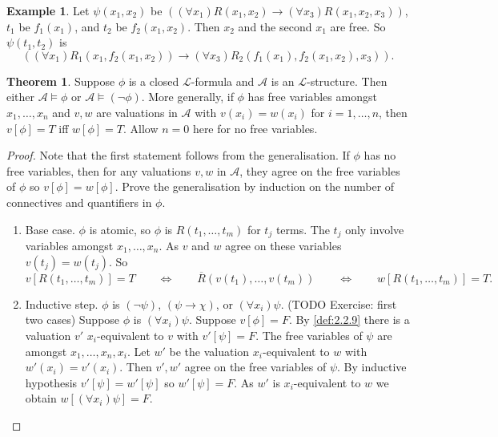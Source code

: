 \documentclass{article}
\newcommand{\rb}[1]{\left( #1 \right)}
\renewcommand{\sb}[1]{\left[ #1 \right]}
\newcommand{\notb}[1]{\rb{\neg #1}}
\newcommand{\impb}[2]{\rb{#1 \rightarrow #2}}
\newcommand{\fab}[1]{\rb{\forall #1}}
\theoremstyle{definition}\newtheorem{definition}{Definition}[subsection]
\theoremstyle{definition}\newtheorem{remark}[definition]{Remark}
\theoremstyle{definition}\newtheorem*{example}{Example}
\theoremstyle{definition}\newtheorem*{note}{Note}
\newtheorem{theorem}[definition]{Theorem}
\begin{document}
\begin{example}
Let $ \psi\rb{x_1, x_2} $ be $ \impb{\fab{x_1}R\rb{x_1, x_2}}{\fab{x_3}R\rb{x_1, x_2, x_3}} $, $ t_1 $ be $ f_1\rb{x_1} $, and $ t_2 $ be $ f_2\rb{x_1, x_2} $. Then $ x_2 $ and the second $ x_1 $ are free. So $ \psi\rb{t_1, t_2} $ is
$$ \impb{\fab{x_1}R_1\rb{x_1, f_2\rb{x_1, x_2}}}{\fab{x_3}R_2\rb{f_1\rb{x_1}, f_2\rb{x_1, x_2}, x_3}}. $$
\end{example}

\begin{theorem}
Suppose $ \phi $ is a closed $ \mathcal{L} $-formula and $ \mathcal{A} $ is an $ \mathcal{L} $-structure. Then either $ \mathcal{A} \vDash \phi $ or $ \mathcal{A} \vDash \notb{\phi} $. More generally, if $ \phi $ has free variables amongst $ x_1, \dots, x_n $ and $ v, w $ are valuations in $ \mathcal{A} $ with $ v\rb{x_i} = w\rb{x_i} $ for $ i = 1, \dots, n $, then $ v\sb{\phi} = T $ iff $ w\sb{\phi} = T $. Allow $ n = 0 $ here for no free variables.
\end{theorem}

\begin{proof}
Note that the first statement follows from the generalisation. If $ \phi $ has no free variables, then for any valuations $ v, w $ in $ \mathcal{A} $, they agree on the free variables of $ \phi $ so $ v\sb{\phi} = w\sb{\phi} $. Prove the generalisation by induction on the number of connectives and quantifiers in $ \phi $.
\begin{enumerate}
\item Base case. $ \phi $ is atomic, so $ \phi $ is $ R\rb{t_1, \dots, t_m} $ for $ t_j $ terms. The $ t_j $ only involve variables amongst $ x_1, \dots, x_n $. As $ v $ and $ w $ agree on these variables $ v\rb{t_j} = w\rb{t_j} $. So
$$ v\sb{R\rb{t_1, \dots, t_m}} = T \qquad \iff \qquad \overline{R}\rb{v\rb{t_1}, \dots, v\rb{t_m}} \qquad \iff \qquad w\sb{R\rb{t_1, \dots, t_m}} = T. $$
\item Inductive step. $ \phi $ is $ \notb{\psi} $, $ \impb{\psi}{\chi} $, or $ \fab{x_i}\psi $. (TODO Exercise: first two cases) Suppose $ \phi $ is $ \fab{x_i}\psi $. Suppose $ v\sb{\phi} = F $. By \ref{def:2.2.9} there is a valuation $ v' $ $ x_i $-equivalent to $ v $ with $ v'\sb{\psi} = F $. The free variables of $ \psi $ are amongst $ x_1, \dots, x_n, x_i $. Let $ w' $ be the valuation $ x_i $-equivalent to $ w $ with $ w'\rb{x_i} = v'\rb{x_i} $. Then $ v', w' $ agree on the free variables of $ \psi $. By inductive hypothesis $ v'\sb{\psi} = w'\sb{\psi} $ so $ w'\sb{\psi} = F $. As $ w' $ is $ x_i $-equivalent to $ w $ we obtain $ w\sb{\fab{x_i}\psi} = F $.
\end{enumerate}
\end{proof}
\end{document}
